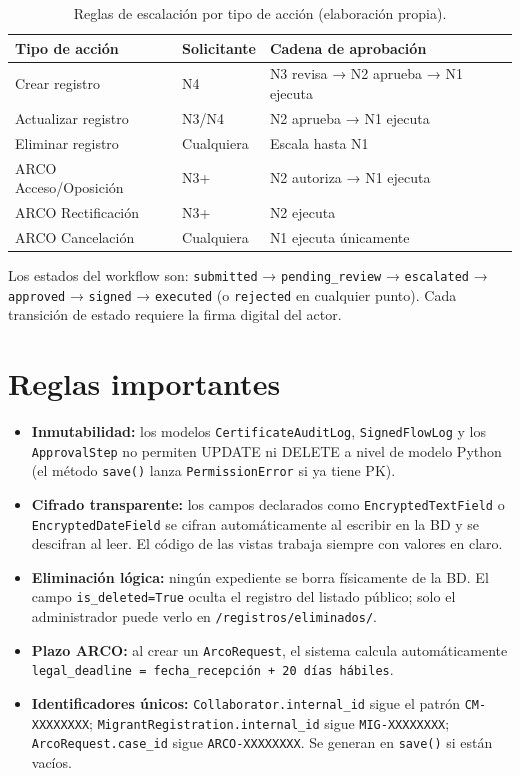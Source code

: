 \documentclass[10pt,letterpaper]{report}
\begin{document}
\begin{table}[H]
\centering
\caption{Reglas de escalación por tipo de acción (elaboración propia).}
\label{tab:escalacion}
\begin{tabularx}{\textwidth}{l l X}
\toprule
\textbf{Tipo de acción} & \textbf{Solicitante} & \textbf{Cadena de aprobación} \\
\midrule
Crear registro & N4 & N3 revisa → N2 aprueba → N1 ejecuta \\
Actualizar registro & N3/N4 & N2 aprueba → N1 ejecuta \\
Eliminar registro & Cualquiera & Escala hasta N1 \\
ARCO Acceso/Oposición & N3+ & N2 autoriza → N1 ejecuta \\
ARCO Rectificación & N3+ & N2 ejecuta \\
ARCO Cancelación & Cualquiera & N1 ejecuta únicamente \\
\bottomrule
\end{tabularx}
\end{table}

Los estados del workflow son: \texttt{submitted} → \texttt{pending\_review} → \texttt{escalated} → \texttt{approved} → \texttt{signed} → \texttt{executed} (o \texttt{rejected} en cualquier punto). Cada transición de estado requiere la firma digital del actor.

\section{Reglas importantes}

\begin{itemize}[leftmargin=*]
    \item \textbf{Inmutabilidad:} los modelos \texttt{CertificateAuditLog}, \texttt{SignedFlowLog} y los \texttt{ApprovalStep} no permiten UPDATE ni DELETE a nivel de modelo Python (el método \texttt{save()} lanza \texttt{PermissionError} si ya tiene PK).
    \item \textbf{Cifrado transparente:} los campos declarados como \texttt{EncryptedTextField} o \texttt{EncryptedDateField} se cifran automáticamente al escribir en la BD y se descifran al leer. El código de las vistas trabaja siempre con valores en claro.
    \item \textbf{Eliminación lógica:} ningún expediente se borra físicamente de la BD. El campo \texttt{is\_deleted=True} oculta el registro del listado público; solo el administrador puede verlo en \texttt{/registros/eliminados/}.
    \item \textbf{Plazo ARCO:} al crear un \texttt{ArcoRequest}, el sistema calcula automáticamente \texttt{legal\_deadline = fecha\_recepción + 20 días hábiles}.
    \item \textbf{Identificadores únicos:} \texttt{Collaborator.internal\_id} sigue el patrón \texttt{CM-XXXXXXXX}; \texttt{MigrantRegistration.internal\_id} sigue \texttt{MIG-XXXXXXXX}; \texttt{ArcoRequest.case\_id} sigue \texttt{ARCO-XXXXXXXX}. Se generan en \texttt{save()} si están vacíos.
\end{itemize}
\end{document}
